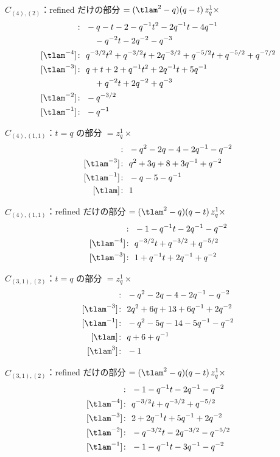 $\hat C_{(4),(2)}$：refined だけの部分 $= (\tlam^2 - q)(q - t)\, z_q^{1} \times$
\begin{align*}
[\tlam^{-5}]\colon\ & -q -t -2 -q^{-1} t^{2} -2 q^{-1} t -4 q^{-1} \\
& \quad -q^{-2} t -2 q^{-2} -q^{-3} \\
[\tlam^{-4}]\colon\ & q^{-3/2} t^{2} +q^{-3/2} t +2 q^{-3/2} +q^{-5/2} t +q^{-5/2} +q^{-7/2} \\
[\tlam^{-3}]\colon\ & q +t +2 +q^{-1} t^{2} +2 q^{-1} t +5 q^{-1} \\
& \quad +q^{-2} t +2 q^{-2} +q^{-3} \\
[\tlam^{-2}]\colon\ & -q^{-3/2} \\
[\tlam^{-1}]\colon\ & -q^{-1}
\end{align*}

$\hat C_{(4),(1,1)}$：$t = q$ の部分 $= z_q^{1} \times$
\begin{align*}
[\tlam^{-5}]\colon\ & -q^{2} -2 q -4 -2 q^{-1} -q^{-2} \\
[\tlam^{-3}]\colon\ & q^{2} +3 q +8 +3 q^{-1} +q^{-2} \\
[\tlam^{-1}]\colon\ & -q -5 -q^{-1} \\
[\tlam]\colon\ & 1
\end{align*}

$\hat C_{(4),(1,1)}$：refined だけの部分 $= (\tlam^2 - q)(q - t)\, z_q^{1} \times$
\begin{align*}
[\tlam^{-5}]\colon\ & -1 -q^{-1} t -2 q^{-1} -q^{-2} \\
[\tlam^{-4}]\colon\ & q^{-3/2} t +q^{-3/2} +q^{-5/2} \\
[\tlam^{-3}]\colon\ & 1 +q^{-1} t +2 q^{-1} +q^{-2}
\end{align*}

$\hat C_{(3,1),(2)}$：$t = q$ の部分 $= z_q^{1} \times$
\begin{align*}
[\tlam^{-5}]\colon\ & -q^{2} -2 q -4 -2 q^{-1} -q^{-2} \\
[\tlam^{-3}]\colon\ & 2 q^{2} +6 q +13 +6 q^{-1} +2 q^{-2} \\
[\tlam^{-1}]\colon\ & -q^{2} -5 q -14 -5 q^{-1} -q^{-2} \\
[\tlam]\colon\ & q +6 +q^{-1} \\
[\tlam^{3}]\colon\ & -1
\end{align*}

$\hat C_{(3,1),(2)}$：refined だけの部分 $= (\tlam^2 - q)(q - t)\, z_q^{1} \times$
\begin{align*}
[\tlam^{-5}]\colon\ & -1 -q^{-1} t -2 q^{-1} -q^{-2} \\
[\tlam^{-4}]\colon\ & q^{-3/2} t +q^{-3/2} +q^{-5/2} \\
[\tlam^{-3}]\colon\ & 2 +2 q^{-1} t +5 q^{-1} +2 q^{-2} \\
[\tlam^{-2}]\colon\ & -q^{-3/2} t -2 q^{-3/2} -q^{-5/2} \\
[\tlam^{-1}]\colon\ & -1 -q^{-1} t -3 q^{-1} -q^{-2}
\end{align*}

